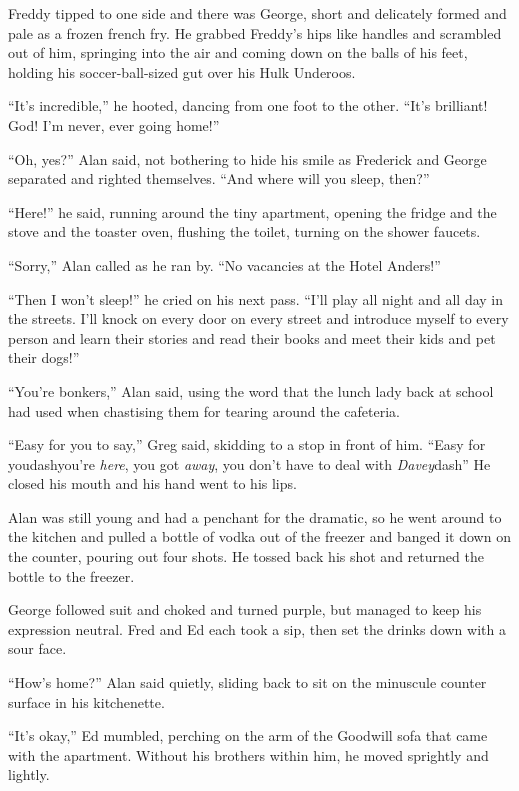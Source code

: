 Freddy tipped to one side and there was George, short and delicately
formed and pale as a frozen french fry.  He grabbed Freddy's hips like
handles and scrambled out of him, springing into the air and coming
down on the balls of his feet, holding his soccer-ball-sized gut over
his Hulk Underoos.

``It's incredible,'' he hooted, dancing from one foot to the other. 
``It's brilliant!  God!  I'm never, ever going home!''

``Oh, yes?'' Alan said, not bothering to hide his smile as Frederick
and George separated and righted themselves.  ``And where will you
sleep, then?''

``Here!'' he said, running around the tiny apartment, opening the
fridge and the stove and the toaster oven, flushing the toilet,
turning on the shower faucets.

``Sorry,'' Alan called as he ran by.  ``No vacancies at the Hotel
Anders!''

``Then I won't sleep!'' he cried on his next pass.  ``I'll play all
night and all day in the streets.  I'll knock on every door on every
street and introduce myself to every person and learn their stories
and read their books and meet their kids and pet their dogs!''

``You're bonkers,'' Alan said, using the word that the lunch lady back
at school had used when chastising them for tearing around the
cafeteria.

``Easy for you to say,'' Greg said, skidding to a stop in front of
him.  ``Easy for youdash{}you're \textit{here}, you got \textit{away},
you don't have to deal with \textit{Davey}dash{}'' He closed his mouth
and his hand went to his lips.

Alan was still young and had a penchant for the dramatic, so he went
around to the kitchen and pulled a bottle of vodka out of the freezer
and banged it down on the counter, pouring out four shots.  He tossed
back his shot and returned the bottle to the freezer.

George followed suit and choked and turned purple, but managed to keep
his expression neutral.  Fred and Ed each took a sip, then set the
drinks down with a sour face.

``How's home?'' Alan said quietly, sliding back to sit on the
minuscule counter surface in his kitchenette.

``It's okay,'' Ed mumbled, perching on the arm of the Goodwill sofa
that came with the apartment.  Without his brothers within him, he
moved sprightly and lightly.

